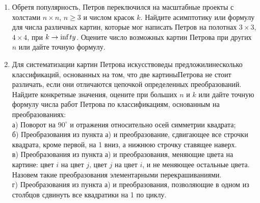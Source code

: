 \begin{enumerate}
\item Обретя популярность, Петров переключился на масштабные проекты с холстами $n\times n$, $n\geq 3$ и числом красок $k$. Найдите асимптотику или формулу для числа различных картин, которые мог написать Петров на полотнах $3\times 3$, $4\times 4$, при $k\to\text{inf\,}ty$. Оцените число возможных картин Петрова при других $n$ или дайте точную формулу.
\item Для систематизации картин Петрова искусствоведы предложили\linebreak несколько классификаций, основанных на том, что две картины\linebreak Петрова не стоит различать, если они отличаются цепочкой определенных преобразований. Найдите конкретные значения, оцените при больших $n$ и $k$ или дайте точную формулу числа работ Петрова по классификациям, основанным на преобразованиях: \\
а) Поворот на $90^{\circ}$ и отражения относительно осей симметрии квадрата; \\
б) Преобразования из пункта а) и преобразование, сдвигающее все строчки квадрата, кроме первой, на 1 вниз, а нижнюю строчку ставящее наверх.\\
в) Преобразования из пункта а) и преобразования, меняющие цвета на картине: цвет $i$ на цвет $j$, цвет $j$ на цвет $i$, и не меняющее остальные цвета. Назовем такие преобразования элементарными перекрашиваниями.\\
г) Преобразования из пункта а) и преобразования, позволяющие в одном из столбцов сдвинуть все квадратики на 1 по циклу. \\
\begin{figure}[h]\label{recolor}
\begin{center}
\end{center}
\end{figure}
\end{enumerate}
